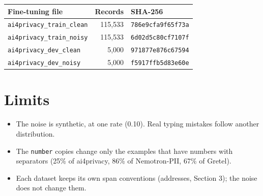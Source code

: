 \documentclass[10pt,a4paper]{article}
\newcommand{\file}[1]{\texttt{#1}}
\begin{document}
\begin{center}
\medskip
\begin{tabular}{@{}lr l@{}}
\toprule
Fine-tuning file & Records & SHA-256 \\
\midrule
\texttt{ai4privacy\_train\_clean} & 115,533 & \texttt{786e9cfa9f65f73a} \\
\texttt{ai4privacy\_train\_noisy} & 115,533 & \texttt{6d02d5c80cf7107f} \\
\texttt{ai4privacy\_dev\_clean} & 5,000 & \texttt{971877e876c67594} \\
\texttt{ai4privacy\_dev\_noisy} & 5,000 & \texttt{f5917ffb5d83e60e} \\
\bottomrule
\end{tabular}
\end{center}

\section{Limits}

\begin{itemize}
\item The noise is synthetic, at one rate (0.10). Real typing mistakes follow another distribution.
\item The \file{number} copies change only the examples that have numbers with separators (25\% of
  ai4privacy, 86\% of Nemotron-PII, 67\% of Gretel).
\item Each dataset keeps its own span conventions (addresses, Section 3); the noise does not change
  them.
\end{itemize}
\end{document}
